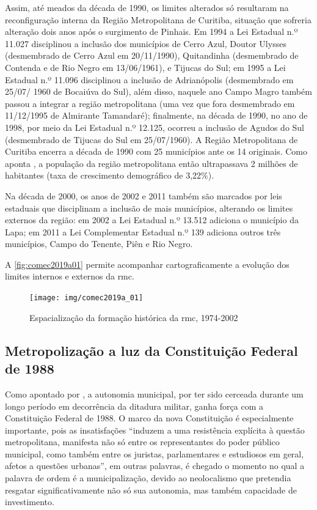 	Assim, até meados da década de 1990, os limites alterados só resultaram na reconfiguração interna da Região Metropolitana de Curitiba, situação que sofreria alteração dois anos após o surgimento de Pinhais. Em 1994 a Lei Estadual n.º 11.027 disciplinou a inclusão dos municípios de Cerro Azul, Doutor Ulysses (desmembrado de Cerro Azul em 20/11/1990), Quitandinha (desmembrado de Contenda e de Rio Negro em 13/06/1961), e Tijucas do Sul; em 1995 a Lei Estadual n.º 11.096 disciplinou a inclusão de Adrianópolis (desmembrado em 25/07/ 1960 de Bocaiúva do Sul), além disso, naquele ano Campo Magro também passou a integrar a região metropolitana (uma vez que fora desmembrado em 11/12/1995 de Almirante Tamandaré); finalmente, na década de 1990, no ano de 1998, por meio da Lei Estadual n.º 12.125, ocorreu a inclusão de Agudos do Sul (desmembrado de Tijucas do Sul em 25/07/1960). A Região Metropolitana de Curitiba encerra a década de 1990 com 25 municípios ante os 14 originais. Como aponta , a população da região metropolitana então ultrapassava 2 milhões de habitantes (taxa de crescimento demográfico de 3,22\%).
	
	Na década de 2000, os anos de 2002 e 2011 também são marcados por leis estaduais que disciplinam a inclusão de mais municípios, alterando os limites externos da região: em 2002 a Lei Estadual n.º 13.512 adiciona o município da Lapa; em 2011 a Lei Complementar Estadual n.º 139 adiciona outros três municípios, Campo do Tenente, Piên e Rio Negro.
	
	A \autoref{fig:comec2019a01} permite acompanhar cartograficamente a evolução dos limites internos e externos da \glsdesc{rmc}.
	
	\begin{figure}
		\centering
		\caption{Espacialização da formação histórica da \glsdesc{rmc}, 1974-2002}
		\label{fig:comec2019a01}
		\texttt{[image: img/comec2019a\_01]}
	\end{figure}
	
	\subsection{Metropolização a luz da Constituição Federal de 1988}
	
	Como apontado por , a autonomia municipal, por ter sido cerceada durante um longo período em decorrência da ditadura militar, ganha força com a Constituição Federal de 1988. O marco da nova Constituição é especialmente importante, pois as insatisfações ``induzem a uma resistência explícita à questão metropolitana, manifesta não só entre os representantes do poder público municipal, como também entre os juristas, parlamentares e estudiosos em geral, afetos a questões urbanas'', em outras palavras, é chegado o momento no qual a palavra de ordem é a municipalização, devido ao neolocalismo que pretendia resgatar significativamente não só sua autonomia, mas também capacidade de investimento.
	
